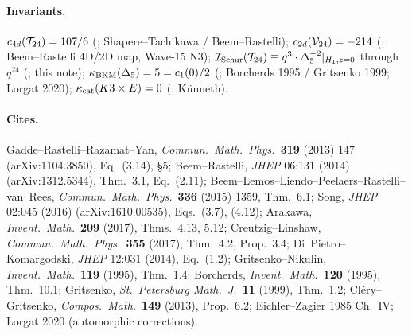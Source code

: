 \paragraph{Invariants.}
$c_{4d}(\mathcal{T}_{24}) = 107/6$ (\ClaimStatusTheorem; Shapere--Tachikawa / Beem--Rastelli);
$c_{2d}(\mathcal{V}_{24}) = -214$ (\ClaimStatusTheorem; Beem--Rastelli 4D/2D
map, Wave-15 N3);
$\mathcal{I}_{\mathrm{Schur}}(\mathcal{T}_{24}) \equiv q^3\cdot\Delta_5^{-2}|_{H_1, z=0}$ through $q^{24}$
(\ClaimStatusTheorem; this note);
$\kappa_{\mathrm{BKM}}(\Delta_5) = 5 = c_1(0)/2$ (\ClaimStatusTheorem; Borcherds 1995 /
Gritsenko 1999; Lorgat 2020);
$\kappa_{\mathrm{cat}}(K3 \times E) = 0$ (\ClaimStatusTheorem; K\"unneth).

\paragraph{Cites.}
Gadde--Rastelli--Razamat--Yan, \emph{Commun.\ Math.\ Phys.}\ \textbf{319}
(2013) 147 (arXiv:1104.3850), Eq.~(3.14), \S5;
Beem--Rastelli, \emph{JHEP} 06:131 (2014) (arXiv:1312.5344), Thm.~3.1,
Eq.~(2.11);
Beem--Lemos--Liendo--Peelaers--Rastelli--van~Rees, \emph{Commun.\ Math.\ Phys.}\
\textbf{336} (2015) 1359, Thm.~6.1;
Song, \emph{JHEP} 02:045 (2016) (arXiv:1610.00535), Eqs.~(3.7), (4.12);
Arakawa, \emph{Invent.\ Math.}\ \textbf{209} (2017), Thms.~4.13, 5.12;
Creutzig--Linshaw, \emph{Commun.\ Math.\ Phys.}\ \textbf{355} (2017),
Thm.~4.2, Prop.~3.4;
Di~Pietro--Komargodski, \emph{JHEP} 12:031 (2014), Eq.~(1.2);
Gritsenko--Nikulin, \emph{Invent.\ Math.}\ \textbf{119} (1995), Thm.~1.4;
Borcherds, \emph{Invent.\ Math.}\ \textbf{120} (1995), Thm.~10.1;
Gritsenko, \emph{St.\ Petersburg Math.\ J.}\ \textbf{11} (1999), Thm.~1.2;
Cl\'ery--Gritsenko, \emph{Compos.\ Math.}\ \textbf{149} (2013),
Prop.~6.2;
Eichler--Zagier 1985 Ch.~IV;
Lorgat 2020 (automorphic corrections).
